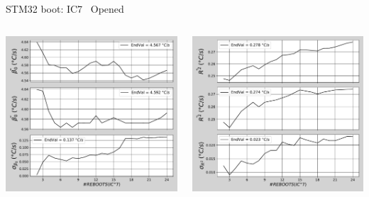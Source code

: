 \begin{frame}{STM32 boot: IC7 \textrightarrow\ Opened}
	\vspace{5mm}
	\begin{columns}
		\begin{column}{0.5\textwidth}
			\includegraphics[width=1.0\textwidth]{./figures/flistCircuit7_25_sl30beta0.pdf}
		\end{column}
		\begin{column}{0.5\textwidth}
			\includegraphics[width=1.0\textwidth]{./figures/flistCircuit7_25_sl30r2.pdf}
		\end{column}
	\end{columns}
\end{frame}


